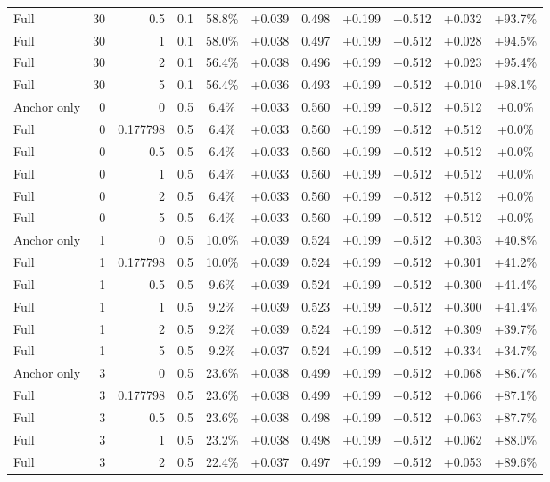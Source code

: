 \begin{table}[htbp]
\begin{tabular}{lrrrccccccc}
Full & 30 & 0.5 & 0.1 & 58.8\% & +0.039 & 0.498 & +0.199 & +0.512 & +0.032 & +93.7\% \\
Full & 30 & 1 & 0.1 & 58.0\% & +0.038 & 0.497 & +0.199 & +0.512 & +0.028 & +94.5\% \\
Full & 30 & 2 & 0.1 & 56.4\% & +0.038 & 0.496 & +0.199 & +0.512 & +0.023 & +95.4\% \\
Full & 30 & 5 & 0.1 & 56.4\% & +0.036 & 0.493 & +0.199 & +0.512 & +0.010 & +98.1\% \\
Anchor only & 0 & 0 & 0.5 & 6.4\% & +0.033 & 0.560 & +0.199 & +0.512 & +0.512 & +0.0\% \\
Full & 0 & 0.177798 & 0.5 & 6.4\% & +0.033 & 0.560 & +0.199 & +0.512 & +0.512 & +0.0\% \\
Full & 0 & 0.5 & 0.5 & 6.4\% & +0.033 & 0.560 & +0.199 & +0.512 & +0.512 & +0.0\% \\
Full & 0 & 1 & 0.5 & 6.4\% & +0.033 & 0.560 & +0.199 & +0.512 & +0.512 & +0.0\% \\
Full & 0 & 2 & 0.5 & 6.4\% & +0.033 & 0.560 & +0.199 & +0.512 & +0.512 & +0.0\% \\
Full & 0 & 5 & 0.5 & 6.4\% & +0.033 & 0.560 & +0.199 & +0.512 & +0.512 & +0.0\% \\
Anchor only & 1 & 0 & 0.5 & 10.0\% & +0.039 & 0.524 & +0.199 & +0.512 & +0.303 & +40.8\% \\
Full & 1 & 0.177798 & 0.5 & 10.0\% & +0.039 & 0.524 & +0.199 & +0.512 & +0.301 & +41.2\% \\
Full & 1 & 0.5 & 0.5 & 9.6\% & +0.039 & 0.524 & +0.199 & +0.512 & +0.300 & +41.4\% \\
Full & 1 & 1 & 0.5 & 9.2\% & +0.039 & 0.523 & +0.199 & +0.512 & +0.300 & +41.4\% \\
Full & 1 & 2 & 0.5 & 9.2\% & +0.039 & 0.524 & +0.199 & +0.512 & +0.309 & +39.7\% \\
Full & 1 & 5 & 0.5 & 9.2\% & +0.037 & 0.524 & +0.199 & +0.512 & +0.334 & +34.7\% \\
Anchor only & 3 & 0 & 0.5 & 23.6\% & +0.038 & 0.499 & +0.199 & +0.512 & +0.068 & +86.7\% \\
Full & 3 & 0.177798 & 0.5 & 23.6\% & +0.038 & 0.499 & +0.199 & +0.512 & +0.066 & +87.1\% \\
Full & 3 & 0.5 & 0.5 & 23.6\% & +0.038 & 0.498 & +0.199 & +0.512 & +0.063 & +87.7\% \\
Full & 3 & 1 & 0.5 & 23.2\% & +0.038 & 0.498 & +0.199 & +0.512 & +0.062 & +88.0\% \\
Full & 3 & 2 & 0.5 & 22.4\% & +0.037 & 0.497 & +0.199 & +0.512 & +0.053 & +89.6\% \\

\end{tabular}
\end{table}
